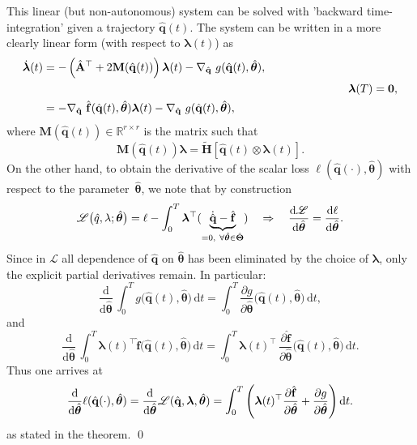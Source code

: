 This linear (but non-autonomous) system can be solved with 'backward time-integration' given a trajectory $\hat{\mathbf{q}}(t)$. The system can be written in a more clearly linear form (with respect to $\bm{\lambda}(t)$) as\\
\begin{align*}
     \dot{\bm{\lambda}}(t) &= -\left(\hat{\mathbf{A}}^{\top} + 2\mathbf{M}(\hat{\mathbf{q}}(t))\right)\bm{\lambda}(t) - \nabla_{\hat{\mathbf{q}}}~g(\hat{\mathbf{q}}(t),\hat{\bm{\theta}}),\\
    &~\hspace{8.8cm}~~~~~\bm{\lambda}(T)=\bm{0},\\
    &= -\nabla_{\hat{\mathbf{q}}}~\hat{\mathbf{f}}(\hat{\mathbf{q}}(t),\hat{\bm{\theta}})\bm{\lambda}(t) - \nabla_{\hat{\mathbf{q}}}~g(\hat{\mathbf{q}}(t),\hat{\bm{\theta}}),
\end{align*}
where $\mathbf{M}(\hat{\mathbf{q}}(t))\in\mathbb{R}^{r\times r}$ is the matrix such that\\
\begin{equation*}
    \mathbf{M}(\hat{\mathbf{q}}(t)) \bm{\lambda} = \tilde{\mathbf{H}}[\hat{\mathbf{q}}(t)\otimes \bm{\lambda}(t)].
\end{equation*}
On the other hand, to obtain the derivative of the scalar loss 
$\ell(\hat{\mathbf{q}}(\cdot),\hat{\bm\theta})$ with respect to the parameter~$\hat{\bm\theta}$, 
we note that by construction\\
$$\mathscr L\bigl(\hat q,\lambda;\hat{\bm\theta}\bigr)=\ell - \int_0^T \bm{\lambda}^{\top}(\underbrace{\dot{\hat{\mathbf{q}}} - \hat{\mathbf{f}}}_{= 0,~\forall\hat{\bm{\theta}}\in\hat{\bm{\Theta}}}) ~~~\Rightarrow~~~\dv{\mathscr{L}}{\hat{\bm{\theta}}} = \dv{\ell}{\hat{\bm{\theta}}}.$$
Since in $\mathscr L$ all dependence of $\hat{\mathbf{q}}$ on $\hat{\bm\theta}$ has been
eliminated by the choice of $\bm{\lambda}$, only the explicit partial derivatives remain.  In particular:\\
$$\frac{\mathrm d}{\mathrm d\hat{\bm\theta}}\,
\int_0^T \!g\bigl(\hat{\mathbf{q}}(t),\hat{\bm\theta}\bigr)\,\mathrm d t
=
\int_0^T 
\frac{\partial g}{\partial\hat{\bm\theta}}
\bigl(\hat{\mathbf{q}}(t),\hat{\bm\theta}\bigr)\,
\mathrm d t,$$
and\\
$$\frac{\mathrm d}{\mathrm d\hat{\bm\theta}}\,
\int_0^T \!\bm{\lambda}(t)^\top
\hat{\mathbf{f}}\bigl(\hat{\mathbf{q}}(t),\hat{\bm\theta}\bigr)\,\mathrm d t
=
\int_0^T
\bm{\lambda}(t)^\top\,
\frac{\partial \hat{\mathbf{f}}}{\partial\hat{\bm\theta}}
\bigl(\hat{\mathbf{q}}(t),\hat{\bm\theta}\bigr)\,
\mathrm d t.$$
Thus one arrives at\\
\begin{equation*}
    \dv{}{\hat{\bm{\theta}}}\ell(\hat{\mathbf{q}}(\cdot),\hat{\bm{\theta}}) =  \dv{}{\hat{\bm{\theta}}} \mathscr{L}(\hat{\mathbf{q}},\bm{\lambda},\hat{\bm{\theta}}) = \int_0^T \left(\bm{\lambda}(t)^{\top}\dfrac{\partial\hat{\mathbf{f}}}{\partial\hat{\bm{\theta}}} + \dfrac{\partial g}{\partial\hat{\bm{\theta}}} \right)\dd t.
\end{equation*}
as stated in the theorem.  \qed


